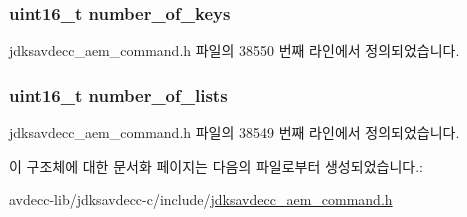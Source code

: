 \subsubsection[{\texorpdfstring{number\+\_\+of\+\_\+keys}{number_of_keys}}]{\setlength{\rightskip}{0pt plus 5cm}uint16\+\_\+t number\+\_\+of\+\_\+keys}\hypertarget{structjdksavdecc__aem__command__auth__get__keychain__list__response_a4b5b63e09e22100325d6689bfbe02865}{}\label{structjdksavdecc__aem__command__auth__get__keychain__list__response_a4b5b63e09e22100325d6689bfbe02865}


jdksavdecc\+\_\+aem\+\_\+command.\+h 파일의 38550 번째 라인에서 정의되었습니다.

\subsubsection[{\texorpdfstring{number\+\_\+of\+\_\+lists}{number_of_lists}}]{\setlength{\rightskip}{0pt plus 5cm}uint16\+\_\+t number\+\_\+of\+\_\+lists}\hypertarget{structjdksavdecc__aem__command__auth__get__keychain__list__response_a45b14c0c59fa21d49e896c11e3344c54}{}\label{structjdksavdecc__aem__command__auth__get__keychain__list__response_a45b14c0c59fa21d49e896c11e3344c54}


jdksavdecc\+\_\+aem\+\_\+command.\+h 파일의 38549 번째 라인에서 정의되었습니다.



이 구조체에 대한 문서화 페이지는 다음의 파일로부터 생성되었습니다.\+:\begin{DoxyCompactItemize}
\item 
avdecc-\/lib/jdksavdecc-\/c/include/\hyperlink{jdksavdecc__aem__command_8h}{jdksavdecc\+\_\+aem\+\_\+command.\+h}\end{DoxyCompactItemize}
